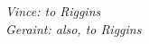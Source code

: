 \cleardoublepage
\thispagestyle{empty}
\begin{center}
\Large\itshape
Vince: to Riggins\\

Geraint: also, to Riggins\\
\end{center}
